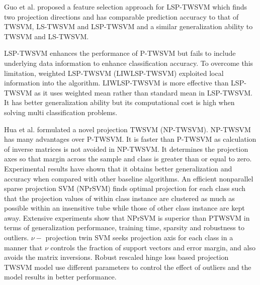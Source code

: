 \documentclass[pdflatex,sn-mathphys]{sn-jnl}%
\theoremstyle{thmstyleone}%
\theoremstyle{thmstyletwo}%
\theoremstyle{thmstylethree}%
\begin{document}
Guo et al. \cite{guo2014feature} proposed a feature selection approach for LSP-TWSVM which finds two projection directions and has comparable prediction accuracy to that of TWSVM, LS-TWSVM and LSP-TWSVM and a similar generalization ability to TWSVM and LS-TWSVM.

LSP-TWSVM enhances the performance of P-TWSVM but fails to include underlying data information to enhance classification accuracy. To overcome this limitation, weighted LSP-TWSVM (LIWLSP-TWSVM)  \cite{hua2015weighted}  exploited local information into the algorithm. LIWLSP-TWSVM is more effective than LSP-TWSVM as it uses weighted mean rather than standard mean in LSP-TWSVM. It has better generalization ability but its computational cost is high when solving multi classification problems.

Hua et al. \cite{hua2017novel} formulated a novel projection TWSVM (NP-TWSVM). NP-TWSVM has many advantages over P-TWSVM. It is faster than P-TWSVM as calculation of inverse matrices is not avoided in NP-TWSVM. It determines the projection axes so that margin across the sample and class is greater than or equal to zero. Experimental results have shown that it obtains better generalization and accuracy when compared with other baseline algorithms. An efficient nonparallel sparse projection SVM (NPrSVM)  \cite{chen2020nprsvm}   finds optimal projection for each class such that the projection values of within class instance are clustered as much as possible within an insensitive tube while those of other class instance are kept away. Extensive experiments show that NPrSVM is superior than PTWSVM in terms of generalization performance, training time, sparsity and robustness to outliers. $\nu-$ projection twin SVM \cite{chen2020nu} seeks projection axis for each class in a manner that $\nu$ controls the fraction of support vectors and error margin, and also avoids the matrix inversions. Robust rescaled hinge loss based projection TWSVM model \cite{ren2021robust} use different parameters to control the effect of outliers and the model results in better performance.
\end{document}
